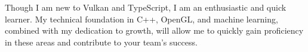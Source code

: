 Though I am new to Vulkan and TypeScript, 
I am an enthusiastic and quick learner. 
My technical foundation in C++, OpenGL, and machine learning, 
combined with my dedication to growth, 
will allow me to quickly gain proficiency in these areas and contribute to your team’s success.